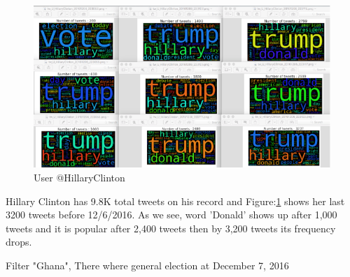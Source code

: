 \documentclass[12pt,notitlepage]{article}
\begin{document}
\begin{figure}[htb]
	\centering
	\includegraphics[width=0.79\linewidth]{WordCloudAnalystGana_20.pdf}
	\caption{User @HillaryClinton}
	\label{fig:WordCloudAnalystGana_20}
\end{figure}

Hillary Clinton has 9.8K total tweets on his record and Figure:\ref{fig:WordCloudAnalystGana_20} shows her last 3200 tweets before 12/6/2016. As we see, word 'Donald' shows up after 1,000 tweets and it is popular after 2,400 tweets then by 3,200 tweets its frequency drops. 

\newpage


Filter "Ghana", There where general election at December 7, 2016
\end{document}
